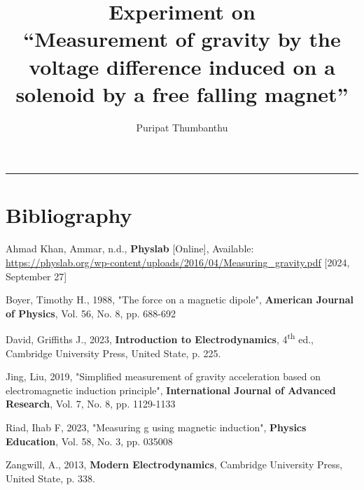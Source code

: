 \documentclass[a4paper, 12pt, article, openany]{memoir}
\newcommand{\llabel}[1]{\label{ite:#1}}
\begin{document}
\frontmatter
\title{
	\vspace{-5em}
	\textbf{
		Experiment on\\
		\enquote{Measurement of gravity by the voltage difference induced on a solenoid by a free falling magnet}
	}
}
\author{
	Puripat Thumbanthu
}
\date{\vspace{-2.5em}}
\maketitle

\hrule

\tableofcontents*

\mainmatter








\chapter{Bibliography}
\begin{enumerate}[label = {[\arabic*]}]
	\item Ahmad Khan, Ammar, n.d., \textbf{Physlab} [Online], Available: \url{https://physlab.org/wp-content/uploads/2016/04/Measuring_gravity.pdf} [2024, September 27] \llabel{khan-no-date}
	\item Boyer, Timothy H., 1988, "The force on a magnetic dipole", \textbf{American Journal of Physics}, Vol. 56, No. 8, pp. 688-692 \llabel{boyer-1988}
	\item David, Griffiths J., 2023, \textbf{Introduction to Electrodynamics}, 4\textsuperscript{th} ed., Cambridge University Press, United State, p. 225. \llabel{griffiths-2023}
	\item Jing, Liu, 2019, "Simplified measurement of gravity acceleration based on electromagnetic induction principle", \textbf{International Journal of Advanced Research}, Vol. 7, No. 8, pp. 1129-1133 \llabel{jing-2019}
	\item Riad, Ihab F, 2023, "Measuring g using magnetic induction", \textbf{Physics Education}, Vol. 58, No. 3, pp. 035008 \llabel{riad-2023}
	\item Zangwill, A., 2013, \textbf{Modern Electrodynamics}, Cambridge University Press, United State, p. 338. \llabel{zangwill-2013}
\end{enumerate}
\end{document}
